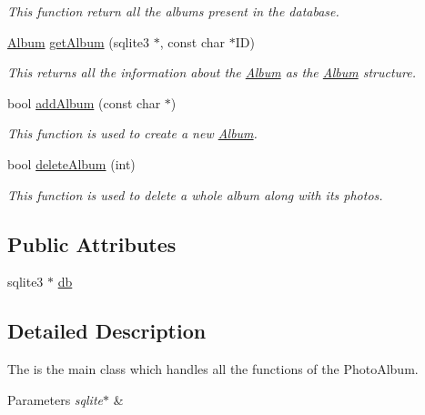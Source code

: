 \begin{DoxyCompactItemize}
\begin{DoxyCompactList}\small\item\em This function return all the albums present in the database. \end{DoxyCompactList}\item 
\hyperlink{classAlbum}{Album} \hyperlink{classMainApp_afe065eb02ba347ad5a9d786588d22dd7}{get\-Album} (sqlite3 $\ast$, const char $\ast$I\-D)
\begin{DoxyCompactList}\small\item\em This returns all the information about the \hyperlink{classAlbum}{Album} as the \hyperlink{classAlbum}{Album} structure. \end{DoxyCompactList}\item 
bool \hyperlink{classMainApp_afc539ec9376c1aad6f32e9351f4b3a8d}{add\-Album} (const char $\ast$)
\begin{DoxyCompactList}\small\item\em This function is used to create a new \hyperlink{classAlbum}{Album}. \end{DoxyCompactList}\item 
bool \hyperlink{classMainApp_aeccd0905b944b037e325f0bf80178703}{delete\-Album} (int)
\begin{DoxyCompactList}\small\item\em This function is used to delete a whole album along with its photos. \end{DoxyCompactList}\end{DoxyCompactItemize}
\subsection*{Public Attributes}
\begin{DoxyCompactItemize}
\item 
sqlite3 $\ast$ \hyperlink{classMainApp_a2d0975ce785555e698fb85c697f303bd}{db}
\end{DoxyCompactItemize}


\subsection{Detailed Description}
The is the main class which handles all the functions of the Photo\-Album. 


\begin{DoxyParams}{Parameters}
{\em sqlite$\ast$} & \\
\hline
\end{DoxyParams}


